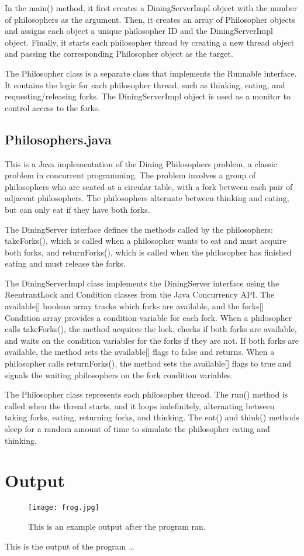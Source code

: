 \documentclass{article}
\begin{document}
In the main() method, it first creates a DiningServerImpl object with the number of philosophers as the argument. Then, it creates an array of Philosopher objects and assigns each object a unique philosopher ID and the DiningServerImpl object. Finally, it starts each philosopher thread by creating a new thread object and passing the corresponding Philosopher object as the target.

The Philosopher class is a separate class that implements the Runnable interface. It contains the logic for each philosopher thread, such as thinking, eating, and requesting/releasing forks. The DiningServerImpl object is used as a monitor to control access to the forks.

\subsection{Philosophers.java}
This is a Java implementation of the Dining Philosophers problem, a classic problem in concurrent programming. The problem involves a group of philosophers who are seated at a circular table, with a fork between each pair of adjacent philosophers. The philosophers alternate between thinking and eating, but can only eat if they have both forks.

The DiningServer interface defines the methods called by the philosophers: takeForks(), which is called when a philosopher wants to eat and must acquire both forks, and returnForks(), which is called when the philosopher has finished eating and must release the forks.

The DiningServerImpl class implements the DiningServer interface using the ReentrantLock and Condition classes from the Java Concurrency API. The available[] boolean array tracks which forks are available, and the forks[] Condition array provides a condition variable for each fork. When a philosopher calls takeForks(), the method acquires the lock, checks if both forks are available, and waits on the condition variables for the forks if they are not. If both forks are available, the method sets the available[] flags to false and returns. When a philosopher calls returnForks(), the method sets the available[] flags to true and signals the waiting philosophers on the fork condition variables.

The Philosopher class represents each philosopher thread. The run() method is called when the thread starts, and it loops indefinitely, alternating between taking forks, eating, returning forks, and thinking. The eat() and think() methods sleep for a random amount of time to simulate the philosopher eating and thinking.

\section{Output}

\begin{figure}
\centering
\texttt{[image: frog.jpg]}
\caption{\label{fig:frog}This is an example output after the program ran.}
\end{figure}

This is the output of the program \dots
\end{document}

